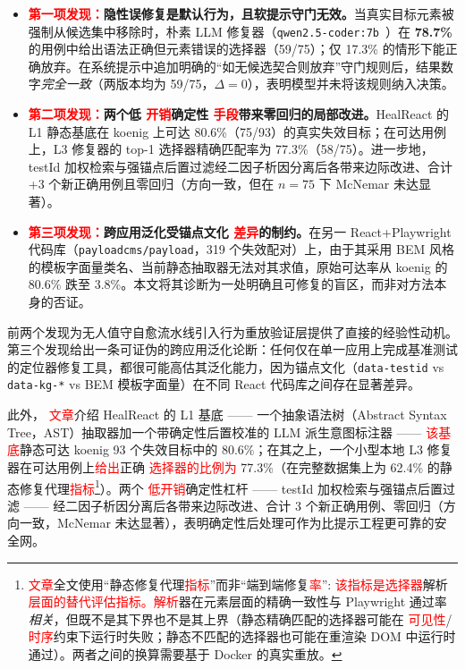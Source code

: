 \documentclass[UTF8, a4paper, 10.5pt, twocolumn, fontset=none]{ctexart}
\providecommand{\DIFaddbegin}{} %
\providecommand{\DIFaddend}{} %
\providecommand{\DIFaddtex}[1]{\textcolor{red}{#1}} %
\providecommand{\DIFadd}[1]{\texorpdfstring{\DIFaddtex{#1}}{#1}} %
\providecommand{\DIFaddincludegraphics}[2][]{{\color{blue}\fbox{\DIFOincludegraphics[#1]{#2}}}} %
\DeclareRobustCommand{\DIFaddbegin}{\DIFOaddbegin \let\includegraphics\DIFaddincludegraphics} %
\DeclareRobustCommand{\DIFaddend}{\DIFOaddend \let\includegraphics\DIFOincludegraphics} %
\begin{document}
\begin{itemize}
\item \textbf{ \DIFaddbegin \DIFadd{第一项发现：}\DIFaddend 隐性误修复是默认行为，且软提示守门无效。}当真实目标元素被强制从候选集中移除时，朴素 LLM 修复器（\texttt{qwen2.5-coder:7b}~\cite{qwenCoderTech2024}）在 \textbf{78.7\%} 的用例中给出语法正确但元素错误的选择器（59/75）；仅 17.3\% 的情形下能正确放弃。在系统提示中追加明确的“如无候选契合则放弃”守门规则后，结果数字\emph{完全一致}（两版本均为 59/75，$\Delta=0$），表明模型并未将该规则纳入决策。
\item \textbf{ \DIFaddbegin \DIFadd{第二项发现：}\DIFaddend 两个低 \DIFaddbegin \DIFadd{开销}\DIFaddend 确定性 \DIFaddbegin \DIFadd{手段}\DIFaddend 带来零回归的局部改进。}HealReact 的 L1 静态基底在 koenig 上可达 80.6\%（75/93）的真实失效目标；在可达用例上，L3 修复器的 top-1 选择器精确匹配率为 77.3\%（58/75）。进一步地，testId 加权检索与强锚点后置过滤经二因子析因分离后各带来边际改进、合计 +3 个新正确用例且零回归（方向一致，但在 $n=75$ 下 McNemar 未达显著）。
\item \textbf{ \DIFaddbegin \DIFadd{第三项发现：}\DIFaddend 跨应用泛化受锚点文化 \DIFaddbegin \DIFadd{差异}\DIFaddend 的制约。}在另一 React+Playwright 代码库（\texttt{payloadcms/payload}，319 个失效配对）上，由于其采用 BEM 风格的模板字面量类名、当前静态抽取器无法对其求值，原始可达率从 koenig 的 80.6\% 跌至 3.8\%。本文将其诊断为一处明确且可修复的盲区，而非对方法本身的否证。
\end{itemize}

\noindent 前两个发现为无人值守自愈流水线引入行为重放验证层提供了直接的经验性动机。第三个发现给出一条可证伪的跨应用泛化论断：任何仅在单一应用上完成基准测试的定位器修复工具，都很可能高估其泛化能力，因为锚点文化（\texttt{data-testid} vs \texttt{data-kg-*} vs BEM 模板字面量）在不同 React 代码库之间存在显著差异。

此外， \DIFaddbegin \DIFadd{文章}\DIFaddend 介绍 HealReact 的 L1 基底 —— 一个抽象语法树（Abstract Syntax Tree，AST）抽取器加一个带确定性后置校准的 LLM 派生意图标注器 ——  \DIFaddbegin \DIFadd{该基底}\DIFaddend 静态可达 koenig 93 个失效目标中的 80.6\%；在其之上，一个小型本地 L3 修复器在可达用例上\DIFaddbegin \DIFadd{给出}\DIFaddend 正确 \DIFaddbegin \DIFadd{选择器的比例为 }\DIFaddend 77.3\%（在完整数据集上为 62.4\% 的静态修复代理\DIFaddbegin \DIFadd{指标}\DIFaddend \footnote{ \DIFaddbegin \DIFadd{文章}\DIFaddend 全文使用“静态修复代理\DIFaddbegin \DIFadd{指标}\DIFaddend ”而非“端到端修复\DIFaddbegin \DIFadd{率}\DIFaddend ”: \DIFaddbegin \DIFadd{该指标是选择器}\DIFaddend 解析\DIFaddbegin \DIFadd{层面的替代评估指标。解析}\DIFaddend 器在元素层面的精确一致性与 Playwright 通过率\emph{相关}，但既不是其下界也不是其上界（静态精确匹配的选择器可能在 \DIFaddbegin \DIFadd{可见性}\DIFaddend / \DIFaddbegin \DIFadd{时序}\DIFaddend 约束下运行时失败；静态不匹配的选择器也可能在重渲染 DOM 中运行时通过）。两者之间的换算需要基于 Docker 的真实重放。}）。两个 \DIFaddbegin \DIFadd{低开销}\DIFaddend 确定性杠杆 —— testId 加权检索与强锚点后置过滤 —— 经二因子析因分离后各带来边际改进、合计 3 个新正确用例、零回归（方向一致，McNemar 未达显著），表明确定性后处理可作为比提示工程更可靠的安全网。
\end{document}
